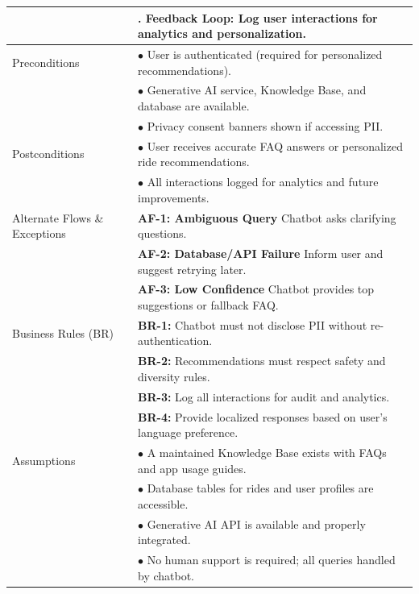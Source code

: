 \begin{longtable}{|>{\raggedright\arraybackslash}p{4cm}|>{\raggedright\arraybackslash}p{11cm}|}
& 6. Feedback Loop: Log user interactions for analytics and personalization. \\
\hline
Preconditions & $\bullet$ User is authenticated (required for personalized recommendations). \\
& $\bullet$ Generative AI service, Knowledge Base, and database are available. \\
& $\bullet$ Privacy consent banners shown if accessing PII. \\
\hline
Postconditions & $\bullet$ User receives accurate FAQ answers or personalized ride recommendations. \\
& $\bullet$ All interactions logged for analytics and future improvements. \\
\hline
Alternate Flows \& Exceptions & \textbf{AF-1: Ambiguous Query} \newline Chatbot asks clarifying questions. \\
& \textbf{AF-2: Database/API Failure} \newline Inform user and suggest retrying later. \\
& \textbf{AF-3: Low Confidence} \newline Chatbot provides top suggestions or fallback FAQ. \\
\hline
Business Rules (BR) & \textbf{BR-1:} Chatbot must not disclose PII without re-authentication. \\
& \textbf{BR-2:} Recommendations must respect safety and diversity rules. \\
& \textbf{BR-3:} Log all interactions for audit and analytics. \\
& \textbf{BR-4:} Provide localized responses based on user's language preference. \\
\hline
Assumptions & $\bullet$ A maintained Knowledge Base exists with FAQs and app usage guides. \\
& $\bullet$ Database tables for rides and user profiles are accessible. \\
& $\bullet$ Generative AI API is available and properly integrated. \\
& $\bullet$ No human support is required; all queries handled by chatbot. \\
\hline
\end{longtable}

